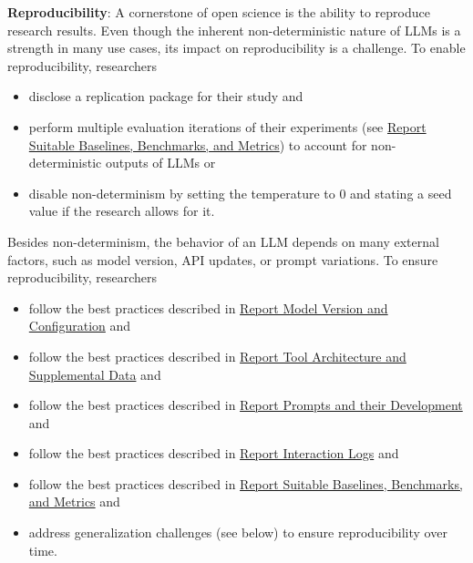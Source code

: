\textbf{Reproducibility}:
A cornerstone of open science is the ability to reproduce research results. Even though the inherent non-deterministic nature of LLMs is a strength in many use cases, its impact on reproducibility is a challenge. To enable reproducibility, researchers 
\begin{itemize}
  \item \must disclose a replication package for their study and
  \item \should perform multiple evaluation iterations of their experiments (see \href{/guidelines/report-baselines-benchmarks-and-metrics}{Report Suitable Baselines, Benchmarks, and Metrics}) to account for non-deterministic outputs of LLMs or
  \item \may disable non-determinism by setting the temperature to 0 and stating a seed value if the research allows for it.
\end{itemize}
Besides non-determinism, the behavior of an LLM depends on many external factors, such as model version, API updates, or prompt variations. To ensure reproducibility, researchers
\begin{itemize}
  \item \should follow the best practices described in \href{/guidelines/report-version-and-configuration}{Report Model Version and Configuration} and
  \item \should follow the best practices described in \href{/guidelines/report-architecture-and-data}{Report Tool Architecture and Supplemental Data} and
  \item \should follow the best practices described in \href{/guidelines/report-prompts}{Report Prompts and their Development} and
  \item \should follow the best practices described in \href{/guidelines/report-interaction-logs}{Report Interaction Logs} and
  \item \should follow the best practices described in \href{/guidelines/report-baselines-benchmarks-and-metrics}{Report Suitable Baselines, Benchmarks, and Metrics} and
  \item \should address generalization challenges (see below) to ensure reproducibility over time.
\end{itemize}

